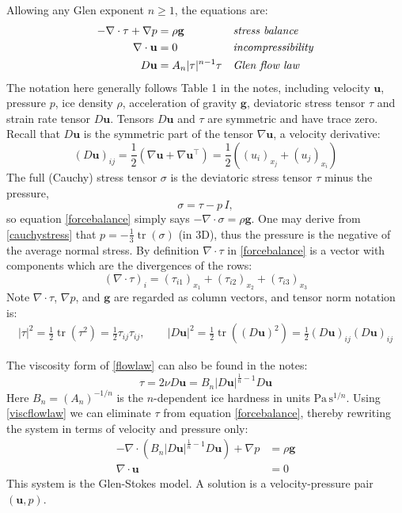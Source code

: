 \documentclass[letterpaper,final,12pt,reqno]{amsart}
\newcommand{\grad}{\nabla}
\newcommand{\Div}{\nabla\cdot}
\newcommand{\trace}{\operatorname{tr}}
\newcommand{\bg}{\mathbf{g}}
\newcommand{\bu}{\mathbf{u}}
\begin{document}
Allowing any Glen exponent $n\ge 1$, the equations are:
\begin{align}
- \nabla \cdot \tau + \nabla p &= \rho \bg &&\text{\emph{stress balance}} \label{forcebalance} \\
\nabla \cdot \bu &= 0 &&\text{\emph{incompressibility}} \label{incompressible} \\
D\bu &= A_n |\tau|^{n-1} \tau &&\text{\emph{Glen flow law}} \label{flowlaw}
\end{align}
The notation here generally follows Table 1 in the notes, including velocity $\bu$, pressure $p$, ice density $\rho$, acceleration of gravity $\bg$, deviatoric stress tensor $\tau$ and strain rate tensor $D\bu$.  Tensors $D\bu$ and $\tau$ are symmetric and have trace zero.  Recall that $D\bu$ is the symmetric part of the tensor $\grad \bu$, a velocity derivative:
\begin{equation}
(D\bu)_{ij} = \frac{1}{2} \left(\grad\bu + \grad\bu^\top\right) = \frac{1}{2} \left((u_i)_{x_j} + (u_j)_{x_i}\right) \label{strainrate}
\end{equation}
The full (Cauchy) stress tensor $\sigma$ is the deviatoric stress tensor $\tau$ minus the pressure,
\begin{equation}
    \sigma = \tau - p\,I,  \label{cauchystress}
\end{equation}
so equation \eqref{forcebalance} simply says $-\Div \sigma = \rho \bg$.  One may derive from \eqref{cauchystress} that $p = -\frac{1}{3} \trace(\sigma)$ (in 3D), thus the pressure is the negative of the average normal stress.  By definition $\Div\tau$ in \eqref{forcebalance} is a vector with components which are the divergences of the rows:
\begin{equation}
    \left(\nabla \cdot \tau\right)_i = \left(\tau_{i1}\right)_{x_1} + \left(\tau_{i2}\right)_{x_2} + \left(\tau_{i3}\right)_{x_3}  \label{divtaudefn}
\end{equation}
Note $\nabla\cdot \tau$, $\nabla p$, and $\bg$ are regarded as column vectors, and tensor norm notation is:
\begin{align*}
|\tau|^2 = \frac{1}{2} \trace\left(\tau^2\right) = \frac{1}{2} \tau_{ij} \tau_{ij}, \qquad |D\bu|^2 = \frac{1}{2} \trace\left((D\bu)^2\right) = \frac{1}{2} (D\bu)_{ij} (D\bu)_{ij}
\end{align*}

The viscosity form of \eqref{flowlaw} can also be found in the notes:
\begin{equation}
\tau = 2\nu D\bu = B_n |D\bu|^{\frac{1}{n} - 1} D\bu  \label{viscflowlaw}
\end{equation}
Here $B_n = (A_n)^{-1/n}$ is the $n$-dependent ice hardness in units $\text{Pa}\,\text{s}^{1/n}$.  Using \eqref{viscflowlaw} we can eliminate $\tau$ from equation \eqref{forcebalance}, thereby rewriting the system in terms of velocity and pressure only:
\begin{align}
- \nabla \cdot \left(B_n |D\bu|^{\frac{1}{n} - 1} D\bu\right) + \nabla p &= \rho \mathbf{g} \label{stokes} \\
\Div \bu &= 0 \label{incompagain}
\end{align}
This system is the Glen-Stokes model.  A solution is a velocity-pressure pair $(\bu,p)$.
\end{document}
